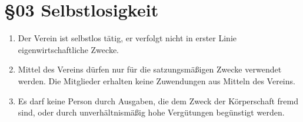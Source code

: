 \section*{§03 Selbstlosigkeit}
\begin{enumerate}
\item Der Verein ist selbstlos tätig, er verfolgt nicht in erster Linie
eigenwirtschaftliche Zwecke.
\item Mittel des Vereins dürfen nur für die satzungsmäßigen Zwecke verwendet
werden. Die Mitglieder erhalten keine Zuwendungen aus Mitteln des
Vereins.
\item Es darf keine Person durch Ausgaben, die dem Zweck der Körperschaft
fremd sind, oder durch unverhältnismäßig hohe Vergütungen begünstigt
werden.
\end{enumerate}